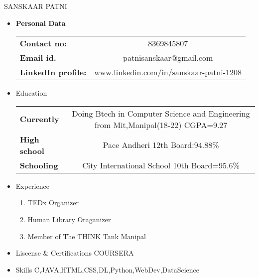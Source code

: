 \documentclass[a4paper,20pt]{article}
\begin{document}
	{\huge SANSKAAR PATNI}\\
	\newline\newline
	\begin{itemize}
		\item \textbf{\large Personal Data}\\
		\newline
		\begin{tabular}{lc}
			\textbf{Contact no:}&8369845807\\
			\textbf {Email id.}              & patnisanskaar@gmail.com\\
			\textbf{LinkedIn profile:}& www.linkedin.com/in/sanskaar-patni-1208
		\end{tabular}
	\item {\large Education}
	\\
	\newline
	\begin{tabular}{lc}
		\textbf{Currently}&Doing Btech in Computer Science and Engineering from Mit,Manipal(18-22) CGPA=9.27\\
		\textbf {High school}              & Pace Andheri 12th Board:94.88\% \\
		\textbf{Schooling}& City International School 10th Board=95.6\%
	\end{tabular}
\item{\large Experience}
\begin{enumerate}
	\item TEDx Organizer
	\item Human Library Oraganizer
	\item Member of The THINK Tank Manipal
\end{enumerate}
\item {Liscense \& Certifications}
\newline
COURSERA
\item {\large Skills}
\newline
C,JAVA,HTML,CSS,DL,Python,WebDev,DataScience
	
	\end{itemize}

	


	
		
\end{document}
